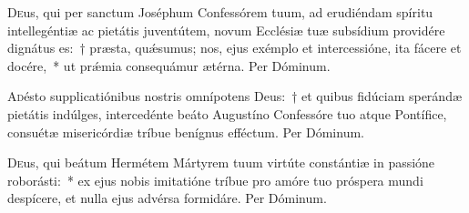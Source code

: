 \documentclass[vesperale_romanum.tex]{subfiles}
\begin{document}
{{\duplexmtv

\oratio

\lettrine{D}{e}us, qui per sanctum Joséphum Confessórem tuum, ad erudiéndam spíritu intellegéntiæ ac pietátis juventútem, novum Ecclésiæ tuæ subsídium providére dignátus es:~† præsta, quǽsumus; nos, ejus exémplo et intercessióne, ita fácere et docére,~* ut prǽmia consequámur ætérna.
Per Dóminum.


\myrule



\duplex


\oratio

\lettrine{A}{d}ésto supplicatiónibus nostris omnípotens Deus:~† et quibus fidúciam sperándæ pietátis indúlges, intercedénte beáto Augustíno Confessóre tuo atque Pontífice, consuétæ misericórdiæ tríbue benígnus efféctum. Per Dóminum.



\oratio

\lettrine{D}{e}us, qui beátum Hermétem Mártyrem tuum virtúte constántiæ in passióne roborásti:~* ex ejus nobis imitatióne tríbue pro amóre tuo próspera mundi despícere, et nulla ejus advérsa formidáre.
Per Dóminum.


\myrule


\duplexmajus




}}
\end{document}
